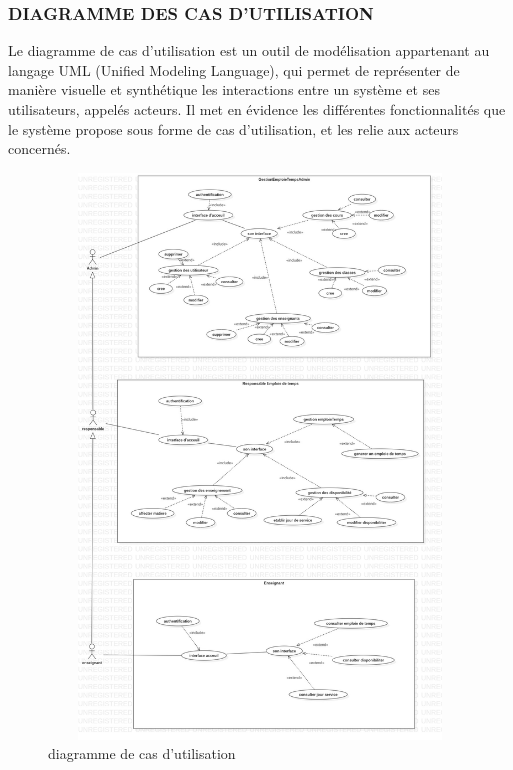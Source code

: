 \documentclass[english,12pt,a4paper]{report}
\begin{document}
\subsubsection{DIAGRAMME DES CAS D'UTILISATION}
Le diagramme de cas d'utilisation est un outil de modélisation appartenant au langage UML (Unified Modeling Language), qui permet de représenter de manière visuelle et synthétique les interactions entre un système et ses utilisateurs, appelés acteurs. Il met en évidence les différentes fonctionnalités que le système propose sous forme de cas d'utilisation, et les relie aux acteurs concernés. 
\begin{figure}[h]
	\centering
	\includegraphics[width=18cm, height=15cm]{UseCaseDiagram1.jpg}
	\caption{diagramme de cas d'utilisation}
	\label{fig3: diagramme de cas d'utilisation}
\end{figure} \par \par
\end{document}
